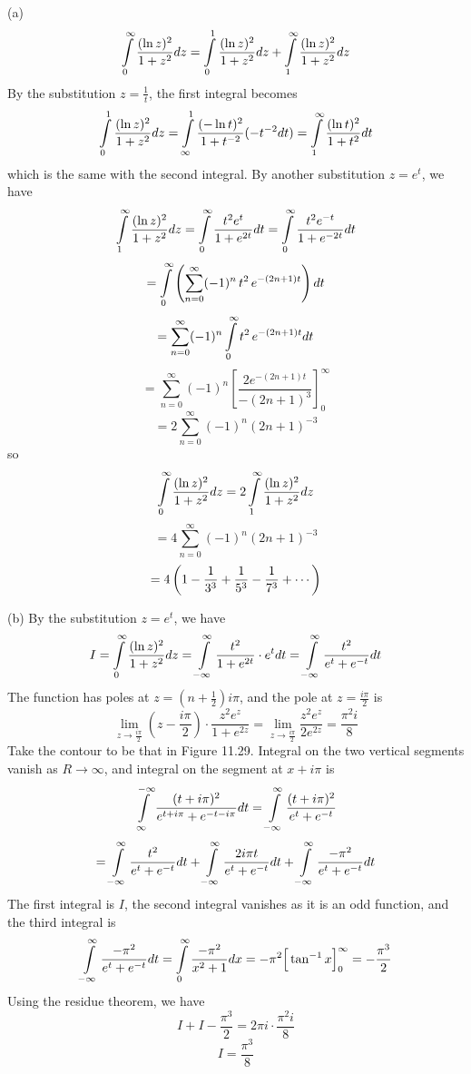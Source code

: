 \documentclass[a4paper]{article}
\begin{document}
(a)
\[
\int\displaylimits_0^\infty\frac{(\ln z)^2}{1+z^2}dz=\int\displaylimits_0^1\frac{(\ln z)^2}{1+z^2}dz+\int\displaylimits_1^\infty\frac{(\ln z)^2}{1+z^2}dz
\]
By the substitution $z=\frac{1}{t}$, the first integral becomes
\[
\int\displaylimits_0^1\frac{(\ln z)^2}{1+z^2}dz=\int\displaylimits_{\infty}^1\frac{(-\ln t)^2}{1+t^{-2}}(-t^{-2}dt)=\int\displaylimits_1^\infty\frac{(\ln t)^2}{1+t^2}dt
\]
which is the same with the second integral. By another substitution $z=e^t$, we have
\[
\int\displaylimits_1^\infty\frac{(\ln z)^2}{1+z^2}dz
=\int\displaylimits_0^\infty\frac{t^2e^t}{1+e^{2t}}dt=\int\displaylimits_0^\infty\frac{t^2e^{-t}}{1+e^{-2t}}dt
\]
\[
=\int\displaylimits_0^\infty\left(\sum_{n=0}^\infty(-1)^n\,t^2\, e^{-(2n+1)t} \right)dt
\]
\[
=\sum_{n=0}^\infty(-1)^n\int\displaylimits_0^\infty t^2\,e^{-(2n+1)t}dt
\]
\[
=\sum_{n=0}^\infty(-1)^n\left[\frac{2e^{-(2n+1)t}}{-(2n+1)^3} \right]_0^\infty
\]
\[
=2\sum_{n=0}^\infty(-1)^n(2n+1)^{-3}
\]
so
\[
\int\displaylimits_0^\infty\frac{(\ln z)^2}{1+z^2}dz=2\int\displaylimits_1^\infty\frac{(\ln z)^2}{1+z^2}dz\]
\[=4\sum_{n=0}^\infty(-1)^n(2n+1)^{-3}\]
\[=4\left(1-\frac{1}{3^3}+\frac{1}{5^3}-\frac{1}{7^3}+\cdots\right)
\]

(b)
By the substitution $z=e^t$, we have
\[
I=\int\displaylimits_0^\infty\frac{(\ln z)^2}{1+z^2}dz=\int\displaylimits_{-\infty}^\infty\frac{t^2}{1+e^{2t}}\cdot e^t dt=\int\displaylimits_{-\infty}^\infty\frac{t^2}{e^t+e^{-t}}dt
\]
The function has poles at $z=(n+\frac{1}{2})i\pi$, and the pole at $z=\frac{i\pi}{2}$ is
\[
\lim_{z\to\frac{i\pi}{2}}(z-\frac{i\pi}{2})\cdot\frac{z^2e^z}{1+e^{2z}}=\lim_{z\to\frac{i\pi}{2}}\frac{z^2e^z}{2e^{2z}}=\frac{\pi^2i}{8}
\]
Take the contour to be that in Figure 11.29. Integral on the two vertical segments vanish as $R\to\infty$, and integral on the segment at $x+i\pi$ is
\[
\int\displaylimits_{\infty}^{-\infty}\frac{(t+i\pi)^2}{e^{t+i\pi}+e^{-t-i\pi}}dt=\int\displaylimits_{-\infty}^\infty\frac{(t+i\pi)^2}{e^t+e^{-t}}\]
\[=\int\displaylimits_{-\infty}^\infty\frac{t^2}{e^t+e^{-t}}dt+\int\displaylimits_{-\infty}^\infty\frac{2i\pi t}{e^t+e^{-t}}dt+\int\displaylimits_{-\infty}^\infty\frac{-\pi^2}{e^t+e^{-t}}dt
\]
The first integral is $I$, the second integral vanishes as it is an odd function, and the third integral is
\[
\int\displaylimits_{-\infty}^\infty\frac{-\pi^2}{e^t+e^{-t}}dt=\int\displaylimits_0^\infty\frac{-\pi^2}{x^2+1}dx=-\pi^2\Big[\tan^{-1}x\Big]_0^\infty=-\frac{\pi^3}{2}
\]
Using the residue theorem, we have
\[
I+I-\frac{\pi^3}{2}=2\pi i\cdot\frac{\pi^2i}{8}
\]
\[
I=\frac{\pi^3}{8}
\]
\end{document}
